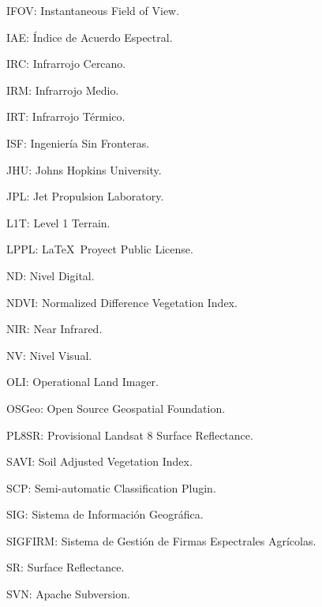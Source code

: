 IFOV: Instantaneous Field of View.

IAE: Índice de Acuerdo Espectral.

IRC: Infrarrojo Cercano.

IRM: Infrarrojo Medio.

IRT: Infrarrojo Térmico.

ISF: Ingeniería Sin Fronteras.

JHU: Johns Hopkins University.

JPL: Jet Propulsion Laboratory.

L1T: Level 1 Terrain.

LPPL: \LaTeX\ Proyect Public License.

ND: Nivel Digital.

NDVI: Normalized Difference Vegetation Index.

NIR: Near Infrared.

NV: Nivel Visual.

OLI: Operational Land Imager.

OSGeo: Open Source Geospatial Foundation.

PL8SR: Provisional Landsat 8 Surface Reflectance.

SAVI: Soil Adjusted Vegetation Index.

SCP: Semi-automatic Classification Plugin.

SIG: Sistema de Información Geográfica.

SIGFIRM: Sistema de Gestión de Firmas Espectrales Agrícolas.

SR: Surface Reflectance.

SVN: Apache Subversion.

